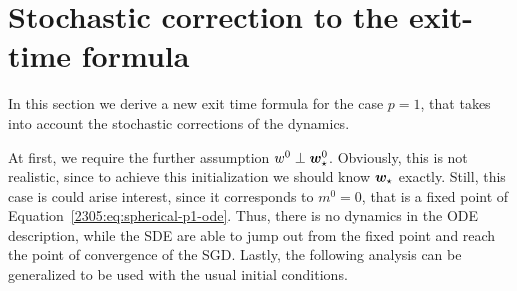 \section{Stochastic correction to the exit-time formula}

\label{2305:app:SDE_exit_time} 
In this section we derive a new exit time formula for the case \(p=1\), that takes into account the stochastic corrections of the dynamics.

At first, we require the further assumption \(w^0\perp{\boldsymbol{w}}_\star^0\). Obviously, this is not realistic, since to achieve this initialization we should know \({\boldsymbol{w}}_\star\) exactly. Still, this case is could arise interest, since it corresponds to \(m^0=0\), that is a fixed point of Equation~\eqref{2305:eq:spherical-p1-ode}. Thus, there is no dynamics in the ODE description, while the SDE are able to jump out from the fixed point and reach the point of convergence of the SGD. Lastly, the following analysis can be generalized to be used with the usual initial conditions.

